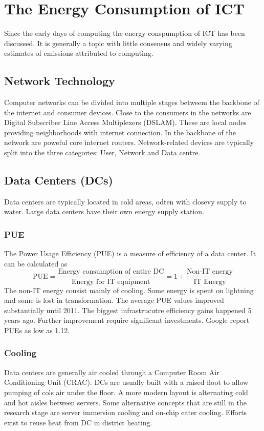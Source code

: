 \section{The Energy Consumption of ICT}
Since the early days of computing the energy conspumption of ICT has been discussed.
It is generally a topic with little consensus and widely varying estimates of emissions  attributed to computing.

\subsection{Network Technology}
Computer networks can be divided into multiple stages betweem the backbone of the internet and consumer devices.
Close to the consumers in the networks are Digital Subscriber Line Access Multiplexers (DSLAM).
These are local nodes providing neighborhoods with internet connection.
In the backbone of the network are poweful core internet routers.
Network-related devices are typically split into the three categories: User, Network and Data centre.

\subsection{Data Centers (DCs)}
Data centers are typically located in cold areas, odten with closevy supply to water.
Large data centers have their own energy supply station.

\subsubsection{PUE}
The Power Usage Efficiency (PUE) is a measure of efficiency of a data center.
It can be calculated as
$$
\text{PUE} = \frac{\text{Energy consumption of entire DC}}{\text{Energy for IT equipment}}
= 1 + \frac{\text{Non-IT energy}}{\text{IT Energy}}
$$
The non-IT energy consist mainly of cooling. Some energy is spent on lightning and some is lost in transformation.
The average PUE values improved substantially until 2011.
The biggest infrastrucutre efficiency gains happened 5 years ago.
Further improvement require significant investments.
Google report PUEs as low as 1.12.

\subsubsection{Cooling}
Data centers are generally air cooled through a Computer Room Air Conditioning Unit (CRAC).
DCs are usually built with a raised floot to allow pumping of cols air under the floor.
A more modern layout is alternating cold and hot aisles between servers.
Some alternative concepts that are still in the research stage are server immersion cooling and on-chip eater cooling.
Efforts exist to reuse heat from DC in district heating.

